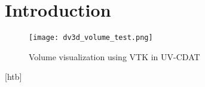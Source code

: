 \section{Introduction}
\label{introduction}
\begin{figure}[htb]
  \centering
  \texttt{[image: dv3d\_volume\_test.png]}
  \caption{Volume visualization using VTK in UV-CDAT}
  \label{fig:dv3d-volume}
\end{figure}[htb]
\lipsum*[1]~\citep{schroeder_visualization_2006}
